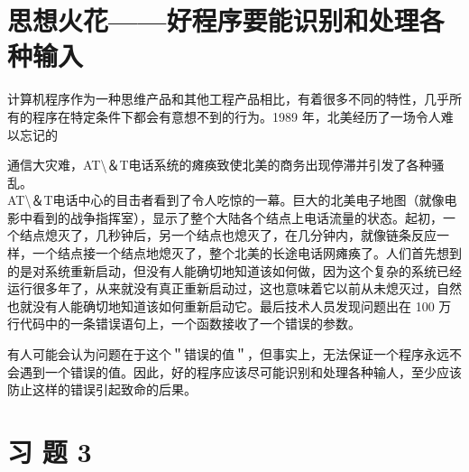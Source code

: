 \documentclass[10pt]{article}
\begin{document}
\section*{思想火花——好程序要能识别和处理各种输入}
计算机程序作为一种思维产品和其他工程产品相比，有着很多不同的特性，几乎所有的程序在特定条件下都会有意想不到的行为。1989 年，北美经历了一场令人难以忘记的

通信大灾难，AT\textbackslash ＆T电话系统的瘫痪致使北美的商务出现停滞并引发了各种骚乱。\\
AT\textbackslash ＆T电话中心的目击者看到了令人吃惊的一幕。巨大的北美电子地图（就像电影中看到的战争指挥室），显示了整个大陆各个结点上电话流量的状态。起初，一个结点熄灭了，几秒钟后，另一个结点也熄灭了，在几分钟内，就像链条反应一样，一个结点接一个结点地熄灭了，整个北美的长途电话网瘫痪了。人们首先想到的是对系统重新启动，但没有人能确切地知道该如何做，因为这个复杂的系统已经运行很多年了，从来就没有真正重新启动过，这也意味着它以前从未熄灭过，自然也就没有人能确切地知道该如何重新启动它。最后技术人员发现问题出在 100 万行代码中的一条错误语句上，一个函数接收了一个错误的参数。

有人可能会认为问题在于这个＂错误的值＂，但事实上，无法保证一个程序永远不会遇到一个错误的值。因此，好的程序应该尽可能识别和处理各种输人，至少应该防止这样的错误引起致命的后果。

\section*{习 题 3}
\end{document}
